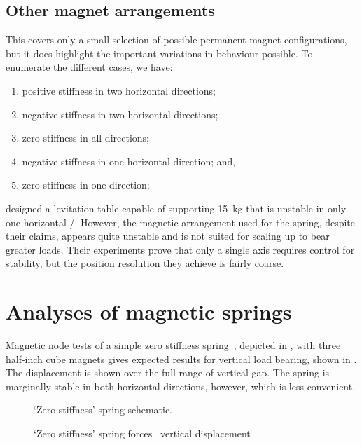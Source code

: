 \documentclass[11pt,a4paper]{memoir}
\begin{document}
\subsection{Other magnet arrangements}

This covers only a small selection of possible permanent magnet
configurations, but it does highlight the important variations in
behaviour possible. To enumerate the different cases, we have:
\begin{enumerate}
\item positive stiffness in two horizontal directions;
\item negative stiffness in two horizontal directions;
\item zero stiffness in all directions;
\item negative stiffness in one horizontal direction; and,
\item zero stiffness in one direction;
\end{enumerate}

\textcite{choi2003} designed a levitation table capable of supporting \SI{15}{kg} that is unstable in only one horizontal \dof/.
However, the magnetic arrangement used for the spring, despite their claims, appears quite unstable and is not suited for scaling up to bear greater loads.
Their experiments prove that only a single axis requires control for stability, but the position resolution they achieve is fairly coarse.

\section{Analyses of magnetic springs}

Magnetic node tests of a simple zero stiffness
spring~\cite{nijsse2001}, depicted in
, with three half-inch cube magnets
gives expected results for vertical load bearing, shown in
. The displacement is shown over the full
range of vertical gap. The spring is marginally stable in both
horizontal directions, however, which is less convenient.
\begin{figure}
  \centering
  \caption{`Zero stiffness' spring schematic.}
\end{figure}

\begin{figure}
  \centering
  \caption{`Zero stiffness' spring forces \vs\ vertical displacement}
\end{figure}
\end{document}
